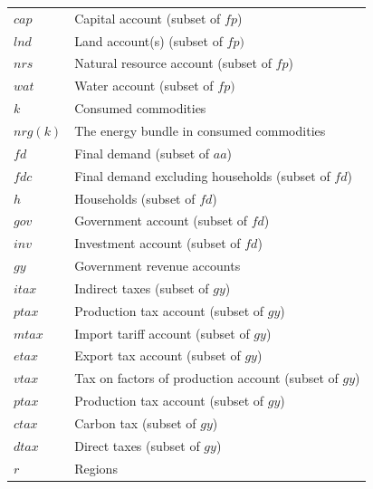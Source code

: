 \documentclass[11pt,letterpaper]{report}
\begin{document}
\begin{table}[H]
\begin{center}
\begin{tabular}{l l}
\scriptsize $\mathit{cap}$  & \scriptsize Capital account (subset of $\mathit{fp}$) \\
\scriptsize $\mathit{lnd}$  & \scriptsize Land account(s) (subset of $\mathit{fp})$ \\
\scriptsize $\mathit{nrs}$  & \scriptsize Natural resource account (subset of $\mathit{fp}$) \\
\scriptsize $\mathit{wat}$  & \scriptsize Water account (subset of $\mathit{fp})$ \\
\scriptsize $\mathit{k}$    & \scriptsize Consumed commodities \\
\scriptsize $\mathit{nrg(k)}$ & \scriptsize The energy bundle in consumed commodities \\
\scriptsize $\mathit{fd}$   & \scriptsize Final demand (subset of $\mathit{aa}$) \\
\scriptsize $\mathit{fdc}$  & \scriptsize Final demand excluding households (subset of $\mathit{fd}$) \\
\scriptsize $\mathit{h}$    & \scriptsize Households (subset of $\mathit{fd}$) \\
\scriptsize $\mathit{gov}$  & \scriptsize Government account (subset of $\mathit{fd}$) \\
\scriptsize $\mathit{inv}$  & \scriptsize Investment account (subset of $\mathit{fd}$) \\
\scriptsize $\mathit{gy}$   & \scriptsize Government revenue accounts \\
\scriptsize $\mathit{itax}$ & \scriptsize Indirect taxes (subset of $\mathit{gy}$) \\
\scriptsize $\mathit{ptax}$ & \scriptsize Production tax account (subset of $\mathit{gy}$) \\
\scriptsize $\mathit{mtax}$ & \scriptsize Import tariff account (subset of $\mathit{gy}$) \\
\scriptsize $\mathit{etax}$ & \scriptsize Export tax account (subset of $\mathit{gy}$) \\
\scriptsize $\mathit{vtax}$ & \scriptsize Tax on factors of production account (subset of $\mathit{gy}$) \\
\scriptsize $\mathit{ptax}$ & \scriptsize Production tax account (subset of $\mathit{gy}$) \\
\scriptsize $\mathit{ctax}$ & \scriptsize Carbon tax (subset of $\mathit{gy}$) \\
\scriptsize $\mathit{dtax}$ & \scriptsize Direct taxes (subset of $\mathit{gy}$) \\
\scriptsize $\mathit{r}$    &  \scriptsize Regions \\

\end{tabular}
\end{center}
\end{table}
\end{document}

